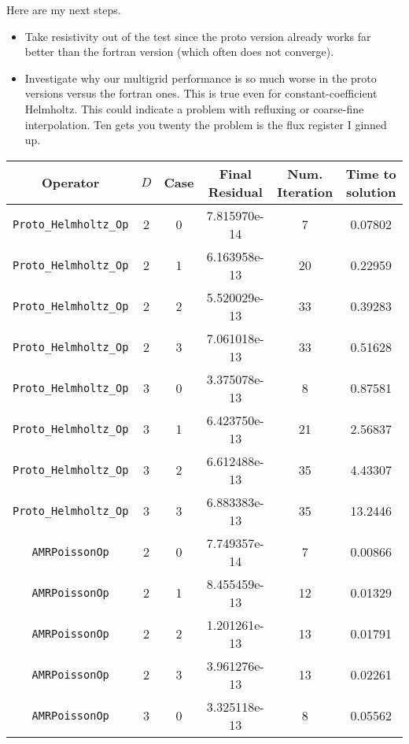 \documentclass{article}
\begin{document}
Here are my next steps.
\begin{itemize}
\item Take resistivity out of the test since the proto version already
  works far better than the fortran version (which often does not converge).
\item Investigate why our multigrid performance is so much worse in
  the proto versions versus the fortran ones.   This is true even for
  constant-coefficient Helmholtz.   This could indicate a problem with
  refluxing or coarse-fine interpolation.   Ten gets you twenty the problem is
  the flux register I ginned up.
\end{itemize}
\begin{small}
\begin{table}
\begin{center}
\begin{tabular}{|c|c|c|c|c||c|} \hline
 Operator                   & $D$ & Case & Final Residual &
 Num. Iteration & Time to solution\\
\hline
 {\tt Proto\_Helmholtz\_Op}       & 2   & 0    & 7.815970e-14   & 7   & 0.07802\\
 {\tt Proto\_Helmholtz\_Op}       & 2   & 1    & 6.163958e-13   & 20  & 0.22959\\
 {\tt Proto\_Helmholtz\_Op}       & 2   & 2    & 5.520029e-13   & 33  & 0.39283\\
 {\tt Proto\_Helmholtz\_Op}       & 2   & 3    & 7.061018e-13   & 33  & 0.51628\\
 {\tt Proto\_Helmholtz\_Op}       & 3   & 0    & 3.375078e-13   & 8   & 0.87581\\
 {\tt Proto\_Helmholtz\_Op}       & 3   & 1    & 6.423750e-13   & 21  & 2.56837\\
 {\tt Proto\_Helmholtz\_Op}       & 3   & 2    & 6.612488e-13   & 35  & 4.43307\\
 {\tt Proto\_Helmholtz\_Op}       & 3   & 3    & 6.883383e-13   & 35  & 13.2446\\
 \hline                                                   
 {\tt AMRPoissonOp}               & 2   & 0    & 7.749357e-14   &  7  & 0.00866\\
 {\tt AMRPoissonOp}               & 2   & 1    & 8.455459e-13   &  12 & 0.01329\\
 {\tt AMRPoissonOp}               & 2   & 2    & 1.201261e-13   &  13 & 0.01791\\
 {\tt AMRPoissonOp}               & 2   & 3    & 3.961276e-13   &  13 & 0.02261\\
 {\tt AMRPoissonOp}               & 3   & 0    & 3.325118e-13   &  8  & 0.05562\\

\end{tabular}
\end{center}
\end{table}
\end{small}
\end{document}
